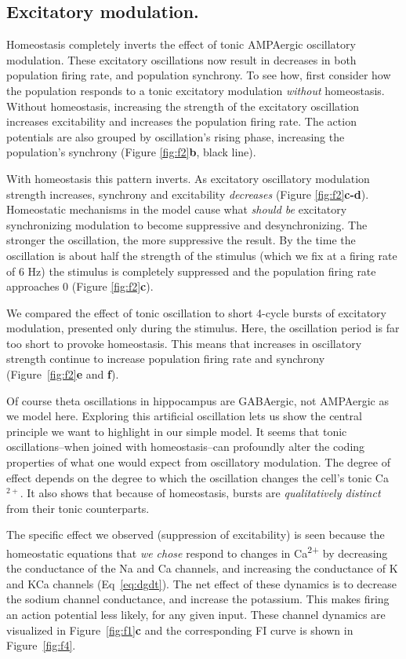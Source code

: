 \documentclass{article}
\begin{document}
\subsection*{Excitatory modulation.}
Homeostasis completely inverts the effect of tonic AMPAergic oscillatory modulation. These excitatory oscillations now result in decreases in both population firing rate, and population synchrony. To see how, first consider how the population responds to a tonic excitatory modulation \textit{without} homeostasis. Without homeostasis, increasing the strength of the excitatory oscillation increases excitability and increases the population firing rate. The action potentials are also grouped by oscillation's rising phase, increasing the population's synchrony (Figure \ref{fig:f2}\textbf{b}, black line). 

With homeostasis this pattern inverts. As excitatory oscillatory modulation strength increases, synchrony and excitability \emph{decreases} (Figure \ref{fig:f2}\textbf{c-d}). Homeostatic mechanisms in the model cause what \emph{should be} excitatory synchronizing modulation to become suppressive and desynchronizing. The stronger the oscillation, the more suppressive the result. By the time the oscillation is about half the strength of the stimulus (which we fix at a firing rate of 6 Hz) the stimulus is completely suppressed and the population firing rate approaches 0 (Figure \ref{fig:f2}\textbf{c}).

We compared the effect of tonic oscillation to short 4-cycle bursts of excitatory modulation, presented only during the stimulus. Here, the oscillation period is far too short to provoke homeostasis. This means that increases in oscillatory strength continue to increase population firing rate and synchrony (Figure~\ref{fig:f2}\textbf{e} and \textbf{f}).

Of course theta oscillations in hippocampus are GABAergic, not AMPAergic as we model here. Exploring this artificial oscillation lets us show the central principle we want to highlight in our simple model. It seems that tonic oscillations--when joined with homeostasis--can profoundly alter the coding properties of what one would expect from oscillatory modulation. The degree of effect depends on the degree to which the oscillation changes the cell's tonic Ca$^{2+}$. It also shows that because of homeostasis, bursts are \textit{qualitatively distinct} from their tonic counterparts.  

The specific effect we observed (suppression of excitability) is seen because the homeostatic equations that \textit{we chose} respond to changes in Ca\textsuperscript{2+} by decreasing the conductance of the Na and Ca channels, and increasing the conductance of K and KCa channels (Eq~\ref{eq:dgdt}). The net effect of these dynamics is to decrease the sodium channel conductance, and increase the potassium. This makes firing an action potential less likely, for any given input. These channel dynamics are visualized in Figure~\ref{fig:f1}\textbf{c} and the corresponding FI curve is shown in Figure~\ref{fig:f4}. 
\end{document}
